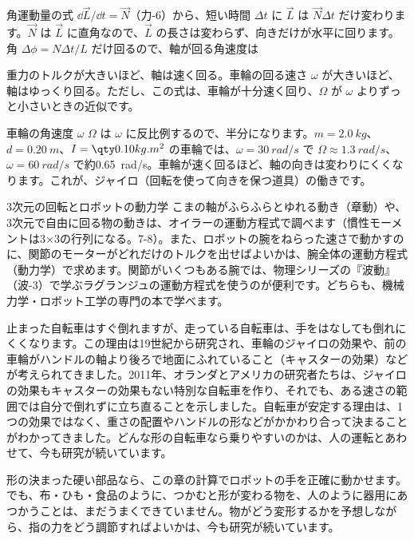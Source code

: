 角運動量の式 $\dd\vec L/\dd t=\vec N$（力-6）から、短い時間 $\Delta t$ に $\vec L$ は $\vec N\Delta t$ だけ変わります。$\vec N$ は $\vec L$ に直角なので、$\vec L$ の長さは変わらず、向きだけが水平に回ります。角 $\Delta\phi=N\Delta t/L$ だけ回るので、軸が回る角速度は
\begin{phyomi}[$\Omega=\dfrac{mgd}{I\omega}$]
重力のトルクが大きいほど、軸は速く回る。車輪の回る速さ $\omega$ が大きいほど、軸はゆっくり回る。ただし、この式は、車輪が十分速く回り、$\Omega$ が $\omega$ よりずっと小さいときの近似です。
\end{phyomi}
\begin{phbaisuru}{車輪の角速度 $\omega$}
$\Omega$ は $\omega$ に反比例するので、半分になります。$m=\qty{2.0}{kg}$、$d=\qty{0.20}{m}$、$I=\pxhI{0.10}$ の車輪では、$\omega=\qty{30}{rad/s}$ で $\Omega\approx\qty{1.3}{rad/s}$、$\omega=\qty{60}{rad/s}$ で約\qty{0.65}{rad/s}。車輪が速く回るほど、軸の向きは変わりにくくなります。これが、ジャイロ（回転を使って向きを保つ道具）の働きです。
\end{phbaisuru}

\begin{phsaki}{3次元の回転とロボットの動力学}
こまの軸がふらふらとゆれる動き（章動）や、3次元で自由に回る物の動きは、オイラーの運動方程式で調べます（慣性モーメントは3×3の行列になる。7-8）。また、ロボットの腕をねらった速さで動かすのに、関節のモーターがどれだけのトルクを出せばよいかは、腕全体の運動方程式（動力学）で求めます。関節がいくつもある腕では、物理シリーズの『波動』（波-3）で学ぶラグランジュの運動方程式を使うのが便利です。どちらも、機械力学・ロボット工学の専門の本で学べます。
\end{phsaki}

\begin{phmada}
止まった自転車はすぐ倒れますが、走っている自転車は、手をはなしても倒れにくくなります。この理由は19世紀から研究され、車輪のジャイロの効果や、前の車輪がハンドルの軸より後ろで地面にふれていること（キャスターの効果）などが考えられてきました。2011年、オランダとアメリカの研究者たちは、ジャイロの効果もキャスターの効果もない特別な自転車を作り、それでも、ある速さの範囲では自分で倒れずに立ち直ることを示しました。自転車が安定する理由は、1つの効果ではなく、重さの配置やハンドルの形などがかかわり合って決まることがわかってきました。どんな形の自転車なら乗りやすいのかは、人の運転とあわせて、今も研究が続いています。
\end{phmada}
\begin{phmada}[やわらかい物をつかむロボット]
形の決まった硬い部品なら、この章の計算でロボットの手を正確に動かせます。でも、布・ひも・食品のように、つかむと形が変わる物を、人のように器用にあつかうことは、まだうまくできていません。物がどう変形するかを予想しながら、指の力をどう調節すればよいかは、今も研究が続いています。
\end{phmada}

